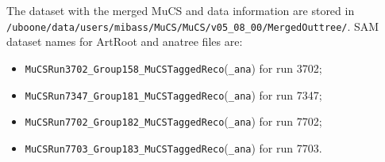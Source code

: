 \documentclass[a4paper]{scrartcl}
\begin{document}
The dataset with the merged MuCS and data information are stored in \texttt{/uboone/\allowbreak data/\allowbreak users/\allowbreak mibass/MuCS/MuCS/v05\_08\_00/MergedOuttree/}.
SAM dataset names for ArtRoot and anatree files are:
\begin{itemize}
  \item \texttt{MuCSRun3702\_Group158\_MuCSTaggedReco}(\texttt{\_ana}) for run 3702;
  \item \texttt{MuCSRun7347\_Group181\_MuCSTaggedReco}(\texttt{\_ana}) for run 7347;
  \item \texttt{MuCSRun7702\_Group182\_MuCSTaggedReco}(\texttt{\_ana}) for run 7702;
  \item \texttt{MuCSRun7703\_Group183\_MuCSTaggedReco}(\texttt{\_ana}) for run 7703.

\end{itemize}

\clearpage{}
\end{document}
